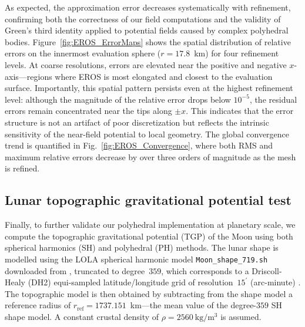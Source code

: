 \documentclass{seg}
\begin{document}
As expected, the approximation error decreases systematically with refinement, confirming both the correctness of our field computations and the validity of Green's third identity applied to potential fields caused by complex polyhedral bodies. Figure~\ref{fig:EROS_ErrorMaps} shows the spatial distribution of relative errors on the innermost evaluation sphere ($r = 17.8$~km) for four refinement levels. At coarse resolutions, errors are elevated near the positive and negative $x$-axis—regions where EROS is most elongated and closest to the evaluation surface. Importantly, this spatial pattern persists even at the highest refinement level: although the magnitude of the relative error drops below $10^{-5}$, the residual errors remain concentrated near the tips along $\pm x$. This indicates that the error structure is not an artifact of poor discretization but reflects the intrinsic sensitivity of the near-field potential to local geometry. The global convergence trend is quantified in Fig.~\ref{fig:EROS_Convergence}, where both RMS and maximum relative errors decrease by over three orders of magnitude as the mesh is refined.

\subsection*{Lunar topographic gravitational potential test}

Finally, to further validate our polyhedral implementation at planetary scale, we compute the topographic gravitational potential (TGP) of the Moon using both spherical harmonics (SH) and polyhedral (PH) methods. The lunar shape is modelled using the LOLA spherical harmonic model \texttt{Moon\_shape\_719.sh} downloaded from \citet{Wieczorek2024}, truncated to degree~$359$, which corresponds to a Driscoll-Healy (DH2) equi-sampled latitude/longitude grid of resolution~$15^{\prime}$ (arc-minute) \citep{Driscoll1994AdvancesinAppliedMathematics,Wieczorek2018GeochemGeophysGeosyst}. The topographic model is then obtained by subtracting from the shape model a reference radius of $r_{\mathrm{ref}} = 1737.151$~km—the mean value of the degree-$359$ SH shape model. A constant crustal density of $\rho = 2560~\mathrm{kg/m^3}$ is assumed.
\end{document}
